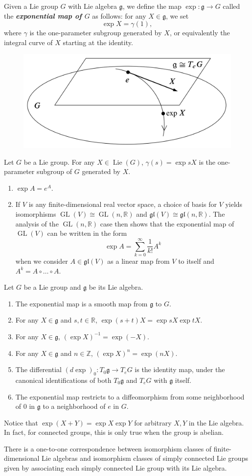 \documentclass{article}
\numberwithin{equation}{section}
\newcommand{\R}{\mathbb{R}}
\newcommand{\Z}{\mathbb{Z}}
\newcommand{\gf}{\mathfrak{g}}
\newcommand{\glf}{\mathfrak{gl}}
\DeclareMathOperator{\Lie}{\operatorname{Lie}}
\DeclareMathOperator{\GL}{GL}
\begin{document}
\begin{defn}
	Given a Lie group $G$ with Lie algebra $\gf$, we define the map $\exp:\gf\to G$ called the \textbf{\textit{exponential map of $G$}} as follows: for any $X\in\gf$, we set
	\[\exp X=\gamma(1),\]
	where $\gamma$ is the one-parameter subgroup generated by $X$, or equivalently the integral curve of $X$ starting at the identity.
\end{defn}
\begin{figure}
	\centering
	\includegraphics[width=0.7\linewidth]{exp}
	\label{fig:exp}
\end{figure}

\begin{prop}
	Let $G$ be a Lie group. For any $X\in\Lie(G)$, $\gamma(s)=\exp sX$ is the one-parameter subgroup of $G$ generated by $X$.
\end{prop}
\begin{example}\leavevmode
	\begin{enumerate}
		\item $\exp A=e^A$.
		\item If $V$ is any finite-dimensional real vector space, a choice of basis for $V$ yields isomorphisms $\GL(V)\cong\GL(n,\R)$ and $\glf(V)\cong\glf(n,\R)$. The analysis of the $\GL(n,\R)$ case then shows that the exponential map of $\GL(V)$ can be written in the form
		\[\exp A=\sum_{k=0}^\infty\frac{1}{k!}A^k\]
		when we consider $A\in\glf(V)$ as a linear map from $V$ to itself and $A^k=A\circ\ldots\circ A$.
	\end{enumerate}
\end{example}
\begin{prop}
	Let $G$ be a Lie group and $\gf$ be its Lie algebra.
	\begin{enumerate}
		\item The exponential map is a smooth map from $\gf$ to $G$.
		\item For any $X\in\gf$ and $s,t\in\R$, $\exp(s+t)X=\exp sX\exp tX$.
		\item For any $X\in\gf$, $(\exp X)^{-1}=\exp(-X)$.
		\item For any $X\in\gf$ and $n\in\Z$, $(\exp X)^n=\exp(nX)$.
		\item The differential $(d\exp)_0:T_0\gf\to T_eG$ is the identity map, under the canonical identifications of both $T_0\gf$ and $T_eG$ with $\gf$ itself.
		\item The exponential map restricts to a diffeomorphism from some neighborhood of 0 in $\gf$ to a neighborhood of $e$ in $G$.
	\end{enumerate}
\end{prop}
Notice that $\exp(X+Y)=\exp X\exp Y$ for arbitrary $X,Y$ in the Lie algebra. In fact, for connected groups, this is only true when the group is abelian.

\begin{thm}
	There is a one-to-one correspondence between isomorphism classes of finite-dimensional Lie algebras and isomorphism classes of simply connected Lie groups given by associating each simply connected Lie group with its Lie algebra.
\end{thm}
\end{document}
